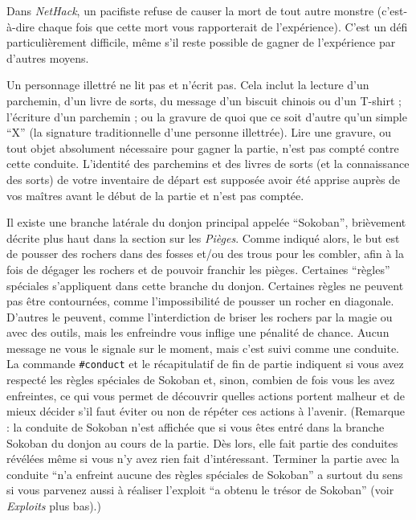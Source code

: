 \documentclass[titlepage]{article}
\begin{document}
Dans \textit{NetHack}, un pacifiste refuse de causer la mort de tout autre monstre
(c'est-à-dire chaque fois que cette mort vous rapporterait de l'expérience).  C'est
un défi particulièrement difficile, même s'il reste possible de gagner de
l'expérience par d'autres moyens.

Un personnage illettré ne lit pas et n'écrit pas.  Cela inclut la lecture
d'un parchemin, d'un livre de sorts, du message d'un biscuit chinois ou d'un T-shirt ;
l'écriture d'un parchemin ; ou la gravure de quoi que ce soit d'autre qu'un simple ``X'' (la
signature traditionnelle d'une personne illettrée).  Lire une gravure,
ou tout objet absolument nécessaire pour gagner la partie, n'est pas compté
contre cette conduite.  L'identité des parchemins et des livres de sorts (et la
connaissance des sorts) de votre inventaire de départ est supposée avoir été
apprise auprès de vos maîtres avant le début de la partie et n'est pas
comptée.

Il existe une branche latérale du donjon principal appelée ``Sokoban'', brièvement
décrite plus haut dans la section sur les \textit{Pièges}.
Comme indiqué alors, le but est de pousser des rochers dans des fosses et/ou des trous
pour les combler, afin à la fois de dégager les rochers et de pouvoir
franchir les pièges.
Certaines ``règles'' spéciales s'appliquent dans cette branche
du donjon.
Certaines règles ne peuvent pas être contournées, comme l'impossibilité de pousser
un rocher en diagonale.
D'autres le peuvent, comme l'interdiction de briser les rochers par la magie ou
avec des outils, mais les enfreindre vous inflige une pénalité de chance.
Aucun message ne vous le signale sur le moment, mais c'est suivi comme une conduite.
La commande \texttt{\#conduct} et le récapitulatif de fin de partie indiquent si
vous avez respecté les règles spéciales de Sokoban et, sinon, combien de
fois vous les avez enfreintes, ce qui vous permet de découvrir quelles
actions portent malheur et de mieux décider s'il faut
éviter ou non de répéter ces actions à l'avenir.
(Remarque : la conduite de Sokoban n'est affichée que si vous êtes
entré dans la branche Sokoban du donjon au cours de la partie.
Dès lors, elle fait partie des conduites révélées même si
vous n'y avez rien fait d'intéressant.
Terminer la partie avec la conduite ``n'a enfreint aucune des règles spéciales
de Sokoban'' a surtout du sens si vous parvenez aussi à réaliser
l'exploit ``a obtenu le trésor de Sokoban''
(voir \textit{Exploits} plus bas).)
\end{document}
